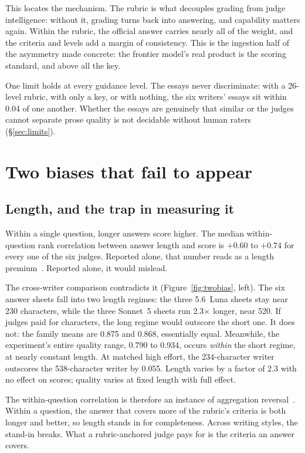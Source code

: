 \documentclass{article}
\begin{document}
This locates the mechanism. The rubric is what decouples grading from judge
intelligence: without it, grading turns back into answering, and capability
matters again. Within the rubric, the official answer carries nearly all of
the weight, and the criteria and levels add a margin of consistency. This is
the ingestion half of the asymmetry made concrete: the frontier model's real
product is the scoring standard, and above all the key.

One limit holds at every guidance level. The essays never discriminate: with
a 26-level rubric, with only a key, or with nothing, the six writers' essays
sit within 0.04 of one another. Whether the essays are genuinely that
similar or the judges cannot separate prose quality is not decidable without
human raters (\S\ref{sec:limits}).

\section{Two biases that fail to appear}
\label{sec:bias}

\subsection{Length, and the trap in measuring it}

Within a single question, longer answers score higher. The median
within-question rank correlation between answer length and score is $+0.60$ to
$+0.74$ for every one of the six judges. Reported alone, that number reads as
a length premium~\cite{dubois2024}. Reported alone, it would mislead.

The cross-writer comparison contradicts it (Figure~\ref{fig:twobias}, left).
The six answer sheets fall into two length regimes: the three 5.6~Luna
sheets stay near 230 characters, while the three Sonnet~5 sheets run
2.3$\times$ longer, near 520. If judges paid for characters, the long regime would
outscore the short one. It does not: the family means are 0.875 and 0.868,
essentially equal. Meanwhile, the experiment's entire quality range, 0.790 to
0.934, occurs \emph{within} the short regime, at nearly constant length. At
matched high effort, the 234-character writer outscores the 538-character
writer by 0.055. Length varies by a factor of 2.3 with no effect on scores;
quality varies at fixed length with full effect.

The within-question correlation is therefore an instance of aggregation
reversal~\cite{simpson1951}. Within a question, the answer that covers more of
the rubric's criteria is both longer and better, so length stands in for
completeness. Across writing styles, the stand-in breaks. What a rubric-anchored judge
pays for is the criteria an answer covers.
\end{document}
